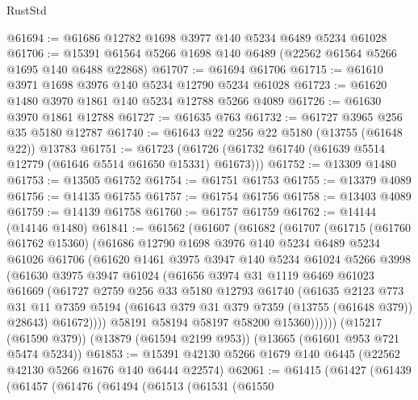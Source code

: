 \begin{lexlean}{RustStd}
\begin{coremodule}
@61694 := @61686 @12782 @1698 @3977 @140 @5234 @6489 @5234 @61028
@61706 := @15391 @61564 @5266 @1698 @140 @6489 (@22562 @61564 @5266 @1695 @140 @6488 @22868)
@61707 := @61694 @61706
@61715 := @61610 @3971 @1698 @3976 @140 @5234 @12790 @5234 @61028
@61723 := @61620 @1480 @3970 @1861 @140 @5234 @12788 @5266 @4089
@61726 := @61630 @3970 @1861 @12788
@61727 := @61635 @763
@61732 := @61727 @3965 @256 @35 @5180 @12787
@61740 := @61643 @22 @256 @22 @5180 (@13755 (@61648 @22)) @13783
@61751 := @61723 (@61726 (@61732 @61740 (@61639 @5514 @12779 (@61646 @5514 @61650 @15331) @61673)))
@61752 := @13309 @1480
@61753 := @13505 @61752
@61754 := @61751 @61753
@61755 := @13379 @4089
@61756 := @14135 @61755
@61757 := @61754 @61756
@61758 := @13403 @4089
@61759 := @14139 @61758
@61760 := @61757 @61759
@61762 := @14144 (@14146 @1480)
@61841 := @61562
    (@61607
      (@61682
        (@61707
          (@61715
            (@61760 @61762 @15360)
            (@61686
              @12790
              @1698
              @3976
              @140
              @5234
              @6489
              @5234
              @61026
              @61706
              (@61620
                @1461
                @3975
                @3947
                @140
                @5234
                @61024
                @5266
                @3998
                (@61630
                  @3975
                  @3947
                  @61024
                  (@61656
                    @3974
                    @31
                    @1119
                    @6469
                    @61023
                    @61669
                    (@61727
                      @2759
                      @256
                      @33
                      @5180
                      @12793
                      @61740
                      (@61635
                        @2123
                        @773
                        @31
                        @11
                        @7359
                        @5194
                        (@61643 @379 @31 @379 @7359 (@13755 (@61648 @379)) @28643)
                        @61672))))
                @58191
                @58194
                @58197
                @58200
                @15360))))))
    (@15217 (@61590 @379))
    (@13879 (@61594 @2199 @953))
    (@13665 (@61601 @953 @721 @5474 @5234))
@61853 := @15391 @42130 @5266 @1679 @140 @6445 (@22562 @42130 @5266 @1676 @140 @6444 @22574)
@62061 := @61415
    (@61427
      (@61439
        (@61457
          (@61476
            (@61494
              (@61513
                (@61531
                  (@61550

\end{coremodule}
\end{lexlean}
